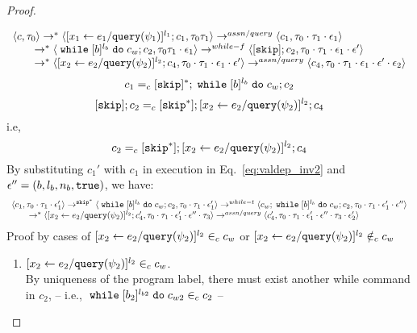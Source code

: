 {\begin{proof}
\begin{subproof}
\[
  \begin{array}{l}   
  \langle {c}, \mathtt{\tau}_0 \rangle \rightarrow^{*} 
  \langle [\mathrel{ {x}_1 \leftarrow e_1 / {\tt query}(\psi_1) }]^{l_1} ; {c}_1, \mathtt{\tau}_0 \mathtt{\tau}_1 \rangle  
  \rightarrow^{assn/query}
  \langle c_1, \mathtt{\tau}_0 \cdot \mathtt{\tau}_1 \cdot \mathtt{\epsilon}_1 \rangle 
  \\
  \qquad \rightarrow^{*} 
  \langle \;\mathtt{while}\; [b]^{l_b} \;\mathtt{do}\; c_w;{c}_2, 
  \mathtt{\tau}_0 \mathtt{\tau}_1 \cdot \mathtt{\epsilon}_1 \rangle 
  \rightarrow^{while-f} 
  \langle [\mathtt{skip}]; c_2, \mathtt{\tau}_0 \cdot \mathtt{\tau}_1 \cdot \mathtt{\epsilon}_1 \cdot \mathtt{\epsilon}' \rangle 
  \\
  \qquad \rightarrow^{*} 
  \langle [\mathrel{ {x}_2 \leftarrow e_2 / {\tt query}(\psi_2) }]^{l_2};{c}_4, 
  \mathtt{\tau}_0 \cdot \mathtt{\tau}_1 \cdot \mathtt{\epsilon}_1 \cdot \mathtt{\epsilon}' \rangle 
  \rightarrow^{assn/query} 
  \langle {c}_4,  \mathtt{\tau}_0 \cdot \mathtt{\tau}_1 \cdot \mathtt{\epsilon}_1 \cdot \mathtt{\epsilon}' \cdot \mathtt{\epsilon}_2 \rangle 
  \end{array}
\]
%
\[
  c_1 =_c [\mathtt{skip}]{}^*; \;\mathtt{while}\; [b]^{l_b} \;\mathtt{do}\; c_w;{c}_2
\]
% 
\[
  [\mathtt{skip}]; c_2 =_c [\mathtt{skip}^*];[\mathrel{ {x}_2 \leftarrow e_2 / {\tt query}(\psi_2) }]^{l_2};{c}_4
\]
i.e,
\[
  c_2 =_c [\mathtt{skip}^*];[\mathrel{ {x}_2 \leftarrow e_2 / {\tt query}(\psi_2) }]^{l_2};{c}_4
\]
%
By substituting $c_1'$ with $c_1$ in execution in Eq.~\ref{eq:valdep_inv2} and $\mathtt{\epsilon}'' = (b, l_b, n_b, \mathtt{true})$, we have:
  \begin{equation}
  \label{eq:m1testwhile_inv2}
  \begin{array}{l}   
  \langle c_1, \mathtt{\tau}_0 \cdot \mathtt{\tau}_1 \cdot \mathtt{\epsilon}_1' \rangle 
  \rightarrow^{\mathtt{skip}^*} 
  \langle \;\mathtt{while}\; [b]^{l_b} \;\mathtt{do}\; c_w;{c}_2, \mathtt{\tau}_0 \cdot \mathtt{\tau}_1 \cdot \mathtt{\epsilon}_1' \rangle 
  \rightarrow^{while-t} 
  \langle c_w;\;\mathtt{while}\; [b]^{l_b} \;\mathtt{do}\; c_w;c_2, \mathtt{\tau}_0 \cdot \mathtt{\tau}_1 \cdot \mathtt{\epsilon}_1' \cdot \mathtt{\epsilon}'' \rangle 
  \\
  \qquad \rightarrow^{*} 
  \langle [\mathrel{ {x}_2 \leftarrow e_2 / {\tt query}(\psi_2) }]^{l_2};{c}_4', 
  \mathtt{\tau}_0 \cdot \mathtt{\tau}_1 \cdot \mathtt{\epsilon}_1' \cdot \mathtt{\epsilon}'' \cdot \mathtt{\tau}_3 \rangle
  \rightarrow^{assn/query} 
  \langle {c}_4',  \mathtt{\tau}_0 \cdot \mathtt{\tau}_1 \cdot \mathtt{\epsilon}_1' \cdot \mathtt{\epsilon}'' \cdot \mathtt{\tau}_3 \cdot \mathtt{\epsilon}_2' \rangle 
\end{array}
\end{equation}
%
Proof by cases of $[\mathrel{ {x}_2 \leftarrow e_2 / {\tt query}(\psi_2) }]^{l_2} \in_c c_w$ or 
$[\mathrel{ {x}_2 \leftarrow e_2 / {\tt query}(\psi_2) }]^{l_2} \notin_c c_w$
\begin{enumerate}
  \item $[\mathrel{ {x}_2 \leftarrow e_2 / {\tt query}(\psi_2) }]^{l_2} \in_c c_w$.
  \\
  By uniqueness of the program label, there must exist another while command in $c_2$, -- i.e., $\;\mathtt{while}\; [b_2]^{l_{b2}} \;\mathtt{do}\; c_{w2} \in_c c_2$ --

\end{enumerate}
\end{subproof}
\end{proof}}

